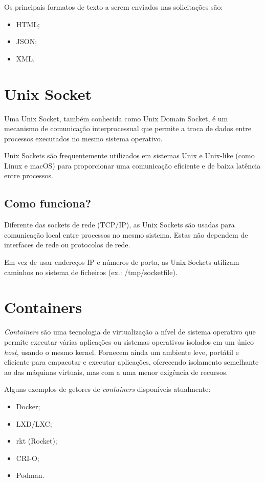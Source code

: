 Os principais formatos de texto a serem enviados nas solicitações são:
\begin{itemize}
    \item HTML;
    \item JSON;
    \item XML.
\end{itemize}


\section{Unix Socket}

Uma Unix Socket, também conhecida como Unix Domain Socket, 
é um mecanismo de comunicação interprocessual  que permite a troca de dados 
entre processos executados no mesmo sistema operativo.

Unix Sockets são frequentemente utilizados em sistemas Unix e Unix-like
(como Linux e macOS) para proporcionar uma comunicação eficiente e de baixa 
latência entre processos.


\subsection{Como funciona?}

Diferente das sockets de rede (TCP/IP), as Unix Sockets são usadas para 
comunicação local entre processos no mesmo sistema. Estas não dependem de interfaces 
de rede ou protocolos de rede.

Em vez de usar endereços IP e números de porta, as Unix Sockets utilizam caminhos 
no sistema de ficheiros (ex.: /tmp/socketfile).

\section{Containers}

\textit{Containers} são uma tecnologia de virtualização a nível de sistema operativo que 
permite executar várias aplicações ou sistemas operativos isolados em um único \textit{host}, usando o mesmo kernel. 
Fornecem ainda um ambiente leve, portátil e eficiente para empacotar e executar aplicações,
oferecendo isolamento semelhante ao das máquinas virtuais, mas com a uma menor
exigência de recursos.

Alguns exemplos de getores de \textit{containers} disponiveis atualmente:
\begin{itemize}
    \item Docker;
    \item LXD/LXC;
    \item rkt (Rocket);
    \item CRI-O;
    \item Podman.
\end{itemize}



